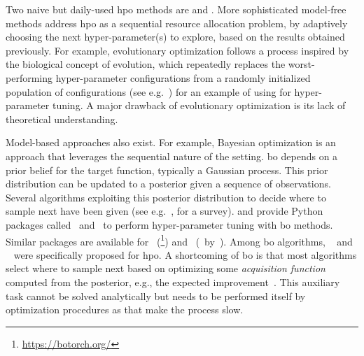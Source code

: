 Two naive but daily-used \gls{hpo} methods are \Grid and \Random. More sophisticated model-free methods address \gls{hpo} as a sequential resource allocation problem, by adaptively choosing the next hyper-parameter(s) to explore, based on the results obtained previously. For example, evolutionary optimization follows a process inspired by the biological concept of evolution, which repeatedly replaces the worst-performing hyper-parameter configurations from a randomly initialized population of configurations (see e.g.~\citealt{loshchilov2016cmaes}) for an example of using \CMAES for hyper-parameter tuning. A major drawback of evolutionary optimization is its lack of theoretical understanding.

Model-based approaches also exist. For example, Bayesian optimization is an approach that leverages the sequential nature of the setting. \gls{bo} depends on a prior belief for the target function, typically a Gaussian process. This prior distribution can be updated to a posterior given a sequence of observations. Several algorithms exploiting this posterior distribution to decide where to sample next have been given (see e.g.~\citealt{shahriari2016loop}, for a survey). \citet{snoek2012spearmint} and \citet{klein2017robo} provide Python packages called \Spearmint\ and \RoBO\ to perform hyper-parameter tuning with \gls{bo} methods. Similar packages are available for \PyTorch\ (\BoTorch\footnote{\url{https://botorch.org/}}) and \TensorFlow\ (\flow\ by~\citealt{knudde2017gpflowopt}). Among \gls{bo} algorithms, \TPE~\citep{bergstra2011tpe} and \SMAC~\citep{hutter2011smac} were specifically proposed for \gls{hpo}. A shortcoming of \gls{bo} is that most algorithms select where to sample next based on optimizing some \emph{acquisition function} computed from the posterior, e.g., the expected improvement~\citep{jones1998ei}. This auxiliary task cannot be solved analytically but needs to be performed itself by optimization procedures as \LBFGS that make the process slow. %




